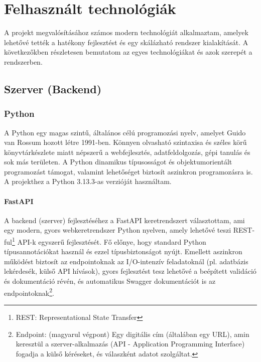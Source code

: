 \chapter{Felhasznált technológiák}

A projekt megvalósításához számos modern technológiát alkalmaztam, amelyek lehetővé tették a hatékony fejlesztést és egy skálázható rendszer kialakítását.
A következőkben részletesen bemutatom az egyes technológiákat és azok szerepét a rendszerben.
\section{Szerver (Backend)}

\subsection{Python}

A Python \cite{Python} egy magas szintű, általános célú programozási nyelv, amelyet Guido van Rossum hozott létre 1991-ben. Könnyen olvasható szintaxisa és széles körű könyvtárkészlete miatt népszerű a webfejlesztés, adatfeldolgozás, gépi tanulás és sok más területen. A Python dinamikus típusosságot és objektumorientált programozást támogat, valamint lehetőséget biztosít aszinkron programozásra is. A projekthez a Python 3.13.3-as verzióját használtam.

\subsubsection{FastAPI}

A backend (szerver) fejlesztéséhez a FastAPI \cite{FastAPI} keretrendszert választottam, ami egy modern, gyors webkeretrendszer Python nyelven, amely lehetővé teszi REST-ful\footnote{REST: Representational State Transfer} API-k egyszerű fejlesztését. Fő előnye, hogy standard Python típusannotációkat használ és ezzel típusbiztonságot nyújt. Emellett aszinkron működést biztosít az endpointoknak az I/O-intenzív feladatoknál (pl. adatbázis lekérdesék, külső API hívások), gyors fejlesztést tesz lehetővé a beépített validáció és dokumentáció révén, és automatikus Swagger \cite{Swagger} dokumentációt is az endpointoknak\footnote{Endpoint: (magyarul végpont) Egy digitális cím (általában egy URL), amin keresztül a szerver-alkalmazás (API - Application Programming Interface) fogadja a külső kéréseket, és válaszként adatot szolgáltat.}.

